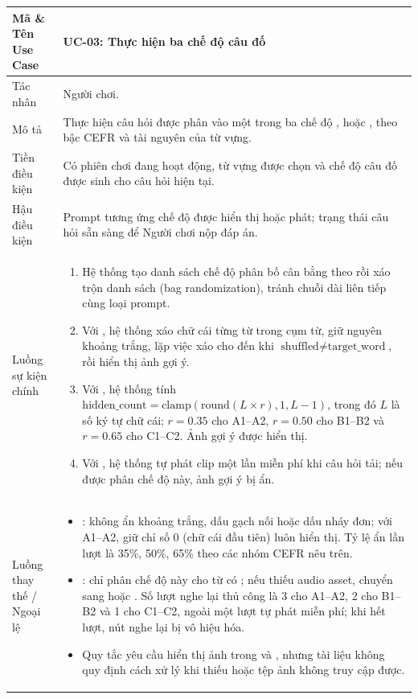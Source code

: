 \begin{xltabular}{\textwidth}{|L{3.3cm}|Y|}
\textbf{Mã \& Tên Use Case} & \textbf{UC-03: Thực hiện ba chế độ câu đố} \\ \hline
Tác nhân & Người chơi. \\ \hline
Mô tả & Thực hiện câu hỏi được phân vào một trong ba chế độ ,  hoặc , theo bậc CEFR và tài nguyên của từ vựng. \\ \hline
Tiền điều kiện & Có phiên chơi đang hoạt động, từ vựng được chọn và chế độ câu đố được sinh cho câu hỏi hiện tại. \\ \hline
Hậu điều kiện & Prompt tương ứng chế độ được hiển thị hoặc phát; trạng thái câu hỏi sẵn sàng để Người chơi nộp đáp án. \\ \hline
Luồng sự kiện chính &
\begin{enumerate}[nosep,leftmargin=*]
    \item Hệ thống tạo danh sách chế độ phân bố cân bằng theo  rồi xáo trộn danh sách (bag randomization), tránh chuỗi dài liên tiếp cùng loại prompt.
    \item Với , hệ thống xáo chữ cái từng từ trong cụm từ, giữ nguyên khoảng trắng, lặp việc xáo cho đến khi \(\text{shuffled} \ne \text{target\_word}\), rồi hiển thị ảnh gợi ý.
    \item Với , hệ thống tính \(\text{hidden\_count}=\text{clamp}(\text{round}(L \times r), 1, L-1)\), trong đó \(L\) là số ký tự chữ cái; \(r=0.35\) cho A1--A2, \(r=0.50\) cho B1--B2 và \(r=0.65\) cho C1--C2. Ảnh gợi ý được hiển thị.
    \item Với , hệ thống tự phát clip một lần miễn phí khi câu hỏi tải; nếu được phân chế độ này, ảnh gợi ý bị ẩn.
\end{enumerate} \\ \hline
Luồng thay thế / Ngoại lệ &
\begin{itemize}[nosep,leftmargin=*]
    \item {}: không ẩn khoảng trắng, dấu gạch nối hoặc dấu nháy đơn; với A1--A2, giữ chỉ số 0 (chữ cái đầu tiên) luôn hiển thị. Tỷ lệ ẩn lần lượt là 35\%, 50\%, 65\% theo các nhóm CEFR nêu trên.
    \item {}: chỉ phân chế độ này cho từ có ; nếu thiếu audio asset, chuyển sang  hoặc . Số lượt nghe lại thủ công là 3 cho A1--A2, 2 cho B1--B2 và 1 cho C1--C2, ngoài một lượt tự phát miễn phí; khi hết lượt, nút nghe lại bị vô hiệu hóa.
    \item Quy tắc yêu cầu hiển thị ảnh trong  và , nhưng tài liệu không quy định cách xử lý khi thiếu  hoặc tệp ảnh không truy cập được.
\end{itemize} \\ \hline


\end{xltabular}

